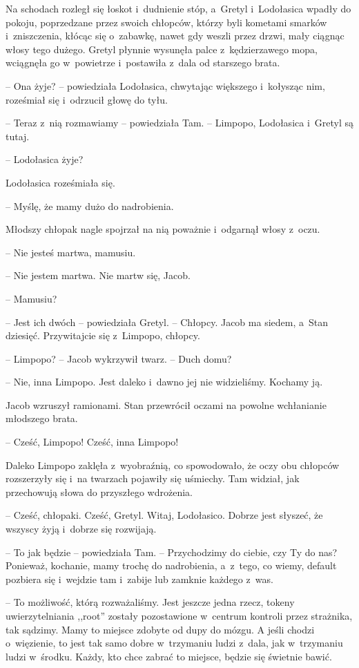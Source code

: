 \documentclass[oneside,polish,11pt,sfheadings]{mwbk}
\begin{document}
Na schodach rozległ się łoskot i~dudnienie stóp, a~Gretyl i~Lodołasica
wpadły do pokoju, poprzedzane przez swoich chłopców, którzy byli
kometami smarków i~zniszczenia, kłócąc się o~zabawkę, nawet gdy weszli
przez drzwi, mały ciągnąc włosy tego dużego. Gretyl płynnie wysunęła
palce z~kędzierzawego mopa, wciągnęła go w~powietrze i~postawiła z~dala
od starszego brata.

-- Ona żyje? -- powiedziała Lodołasica, chwytając większego i~kołysząc
nim, roześmiał się i~odrzucił głowę do tyłu.

-- Teraz z~nią rozmawiamy -- powiedziała Tam. -- Limpopo, Lodołasica i~Gretyl są tutaj.

-- Lodołasica żyje?

Lodołasica roześmiała się. 

-- Myślę, że mamy dużo do nadrobienia.

Młodszy chłopak nagle spojrzał na nią poważnie i~odgarnął włosy z~oczu.

-- Nie jesteś martwa, mamusiu.

-- Nie jestem martwa. Nie martw się, Jacob.

-- Mamusiu?

-- Jest ich dwóch -- powiedziała Gretyl. -- Chłopcy. Jacob ma siedem, a~Stan dziesięć. Przywitajcie się z~Limpopo, chłopcy.

-- Limpopo? -- Jacob wykrzywił twarz. -- Duch domu?

-- Nie, inna Limpopo. Jest daleko i~dawno jej nie widzieliśmy. Kochamy
ją.

Jacob wzruszył ramionami. Stan przewrócił oczami na powolne wchłanianie
młodszego brata. 

-- Cześć, Limpopo! Cześć, inna Limpopo!

Daleko Limpopo zaklęła z~wyobraźnią, co spowodowało, że oczy obu
chłopców rozszerzyły się i~na twarzach pojawiły się uśmiechy. Tam
widział, jak przechowują słowa do przyszłego wdrożenia. 

-- Cześć,
chłopaki. Cześć, Gretyl. Witaj, Lodołasico. Dobrze jest słyszeć, że
wszyscy żyją i~dobrze się rozwijają.

-- To jak będzie -- powiedziała Tam. -- Przychodzimy do ciebie, czy Ty do
nas? Ponieważ, kochanie, mamy trochę do nadrobienia, a~z~tego, co wiemy,
default pozbiera się i~wejdzie tam i~zabije lub zamknie każdego z~was.

-- To możliwość, którą rozważaliśmy. Jest jeszcze jedna rzecz, tokeny
uwierzytelniania ,,root'' zostały pozostawione w~centrum kontroli przez
strażnika, tak sądzimy. Mamy to miejsce zdobyte od dupy do mózgu. A
jeśli chodzi o~więzienie, to jest tak samo dobre w~trzymaniu ludzi z~dala, jak w~trzymaniu ludzi w~środku. Każdy, kto chce zabrać to miejsce,
będzie się świetnie bawić.
\end{document}
